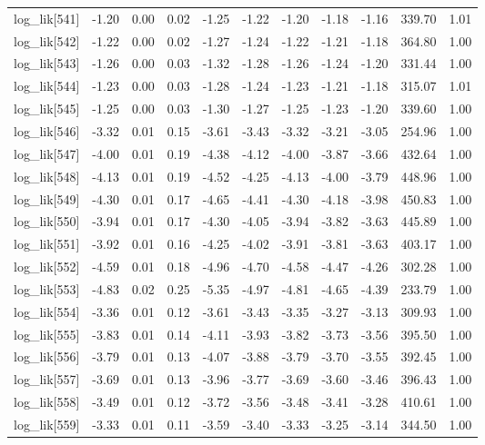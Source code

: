 \begin{table}[ht]
\begin{tabular}{rrrrrrrrrrr}
  log\_lik[541] & -1.20 & 0.00 & 0.02 & -1.25 & -1.22 & -1.20 & -1.18 & -1.16 & 339.70 & 1.01 \\ 
  log\_lik[542] & -1.22 & 0.00 & 0.02 & -1.27 & -1.24 & -1.22 & -1.21 & -1.18 & 364.80 & 1.00 \\ 
  log\_lik[543] & -1.26 & 0.00 & 0.03 & -1.32 & -1.28 & -1.26 & -1.24 & -1.20 & 331.44 & 1.00 \\ 
  log\_lik[544] & -1.23 & 0.00 & 0.03 & -1.28 & -1.24 & -1.23 & -1.21 & -1.18 & 315.07 & 1.01 \\ 
  log\_lik[545] & -1.25 & 0.00 & 0.03 & -1.30 & -1.27 & -1.25 & -1.23 & -1.20 & 339.60 & 1.00 \\ 
  log\_lik[546] & -3.32 & 0.01 & 0.15 & -3.61 & -3.43 & -3.32 & -3.21 & -3.05 & 254.96 & 1.00 \\ 
  log\_lik[547] & -4.00 & 0.01 & 0.19 & -4.38 & -4.12 & -4.00 & -3.87 & -3.66 & 432.64 & 1.00 \\ 
  log\_lik[548] & -4.13 & 0.01 & 0.19 & -4.52 & -4.25 & -4.13 & -4.00 & -3.79 & 448.96 & 1.00 \\ 
  log\_lik[549] & -4.30 & 0.01 & 0.17 & -4.65 & -4.41 & -4.30 & -4.18 & -3.98 & 450.83 & 1.00 \\ 
  log\_lik[550] & -3.94 & 0.01 & 0.17 & -4.30 & -4.05 & -3.94 & -3.82 & -3.63 & 445.89 & 1.00 \\ 
  log\_lik[551] & -3.92 & 0.01 & 0.16 & -4.25 & -4.02 & -3.91 & -3.81 & -3.63 & 403.17 & 1.00 \\ 
  log\_lik[552] & -4.59 & 0.01 & 0.18 & -4.96 & -4.70 & -4.58 & -4.47 & -4.26 & 302.28 & 1.00 \\ 
  log\_lik[553] & -4.83 & 0.02 & 0.25 & -5.35 & -4.97 & -4.81 & -4.65 & -4.39 & 233.79 & 1.00 \\ 
  log\_lik[554] & -3.36 & 0.01 & 0.12 & -3.61 & -3.43 & -3.35 & -3.27 & -3.13 & 309.93 & 1.00 \\ 
  log\_lik[555] & -3.83 & 0.01 & 0.14 & -4.11 & -3.93 & -3.82 & -3.73 & -3.56 & 395.50 & 1.00 \\ 
  log\_lik[556] & -3.79 & 0.01 & 0.13 & -4.07 & -3.88 & -3.79 & -3.70 & -3.55 & 392.45 & 1.00 \\ 
  log\_lik[557] & -3.69 & 0.01 & 0.13 & -3.96 & -3.77 & -3.69 & -3.60 & -3.46 & 396.43 & 1.00 \\ 
  log\_lik[558] & -3.49 & 0.01 & 0.12 & -3.72 & -3.56 & -3.48 & -3.41 & -3.28 & 410.61 & 1.00 \\ 
  log\_lik[559] & -3.33 & 0.01 & 0.11 & -3.59 & -3.40 & -3.33 & -3.25 & -3.14 & 344.50 & 1.00 \\ 

\end{tabular}
\end{table}
